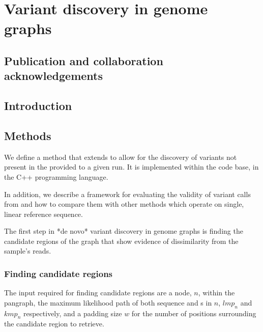 
\chapter{Variant discovery in genome graphs}
\label{chap:denovo}
\ifpdf
    \graphicspath{{Chapter1/Figs/Raster/}{Chapter1/Figs/PDF/}{Chapter1/Figs/}}
\else
    \graphicspath{{Chapter1/Figs/Vector/}{Chapter1/Figs/}}
\fi
\setcounter{section}{-1}
\section{Publication and collaboration acknowledgements}
\label{sec:denovo-acknowledge}
\section{Introduction}

\section{Methods}
We define a method that extends \pandora{} to allow for the discovery of variants not present in the \prg{} provided to a given run. It is implemented within the \pandora{} code base, in the C++ programming language. 

In addition, we describe a framework for evaluating the validity of variant calls from \pandora{} and how to compare them with other methods which operate on single, linear reference sequence.

The first step in *de novo* variant discovery in genome graphs is finding the candidate regions of the graph that show evidence of dissimilarity from the sample's reads.


\subsection{Finding candidate regions}

The input required for finding candidate regions are a node, $n$, within the \pandora{} pangraph, the maximum likelihood path of both sequence and \kmer{}s in $n$, $lmp_n$ and $kmp_n$ respectively, and a padding size $w$ for the number of positions surrounding the candidate region to retrieve. \\

